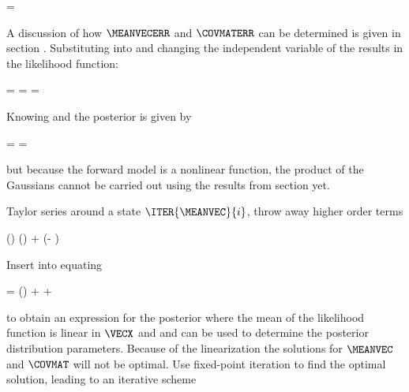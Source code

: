     \startformula
        \PROB{\ERR} = \GAUSS{\ERR}{\MEANVECERR}{\COVMATERR}
    \stopformula

    A discussion of how $\MEANVECERR$ and $\COVMATERR$ can be determined is
    given in section . Substituting 
    into  and changing the independent variable of
    the {\PDF} results in the likelihood function:
    
    \placesubformula
    \startformula
    \startalign[n=3,align={right,middle,left}]
        \NC \PROB{\VECY - \FWD(\VECX)} = \NC
            \GAUSS{\VECY - \FWD(\VECX)}{\MEANVECERR}{\COVMATERR} \NC \NR
        \NC = \NC \GAUSS{\VECY}{\FWD(\VECX)+\MEANVECERR}{\COVMATERR} \NC
            = \LIKELIHOOD {}
    \stopalign
    \stopformula

    Knowing  and  the
    posterior {\PDF} is given by

    \startformula
        \POSTERIOR
        = \frac{\LIKELIHOOD \PRIOR}{\NORMALIZATION}
        = \frac{\GAUSS{\VECY}{\FWD(\VECX) + \MEANVECERR}{\COVMATERR}
            ~\GAUSS{\VECX}{\MEANVECA}{\COVMATA}}{\NORMALIZATION} \EQCOMMA
    \stopformula

    but because the forward model is a nonlinear function, the product of the
    Gaussians cannot be carried out using the results from section
     yet.

    \startsubsection[title=Iterative Solutions]

        Taylor series around a state $\ITER{\MEANVEC}{i}$, throw away higher
        order terms

        \startformula
            \FWD(\VECX) \approx \FWD()
                +  (\VECX - )
        \stopformula

        Insert into  equating

        \startformula
            \VECB = \FWD() + 
             + \MEANVECERR
        \stopformula

        to obtain an expression for the posterior where the mean of the
        likelihood function is linear in $\VECX$ and  and
         can be used to determine the posterior
        distribution parameters. Because of the linearization the solutions for
        $\MEANVEC$ and $\COVMAT$ will not be optimal. Use fixed-point iteration
        to find the optimal solution, leading to an iterative scheme

